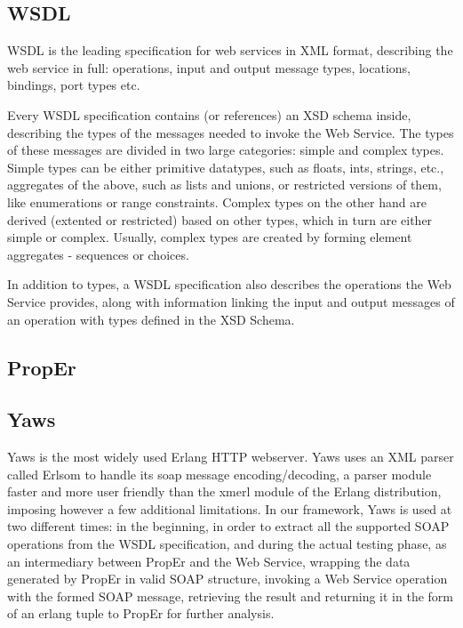 \documentclass[submission,copyright,a4]{eptcs}
\begin{document}

\subsection{WSDL}

WSDL is the leading specification for web services in XML format, describing the web service in full: operations, input and output message types, locations, bindings, port types etc. 

Every WSDL specification contains (or references) an XSD schema inside, describing the types of the messages needed to invoke the Web Service. The types of these messages are divided in two large categories: simple and complex types. Simple types can be either primitive datatypes, such as floats, ints, strings, etc., aggregates of the above, such as lists and unions, or restricted versions of them, like enumerations or range constraints. Complex types on the other hand are derived (extented or restricted) based on other types, which in turn are either simple or complex. Usually, complex types are created by forming element aggregates - sequences or choices. 

In addition to types, a WSDL specification also describes the operations the Web Service provides, along with information linking the input and output messages of an operation with types defined in the XSD Schema. 

\subsection{PropEr}

\subsection{Yaws}

Yaws is the most widely used Erlang HTTP webserver. Yaws uses an XML parser called Erlsom to handle its soap message encoding/decoding, a parser module faster and more user friendly than the xmerl module of the Erlang distribution, imposing however a few additional limitations. In our framework, Yaws is used at two different times: in the beginning, in order to extract all the supported SOAP operations from the WSDL specification, and during the actual testing phase, as an intermediary between PropEr and the Web Service, wrapping the data generated by PropEr in valid SOAP structure, invoking a Web Service operation with the formed SOAP message, retrieving the result and returning it in the form of an erlang tuple to PropEr for further analysis.
\end{document}

